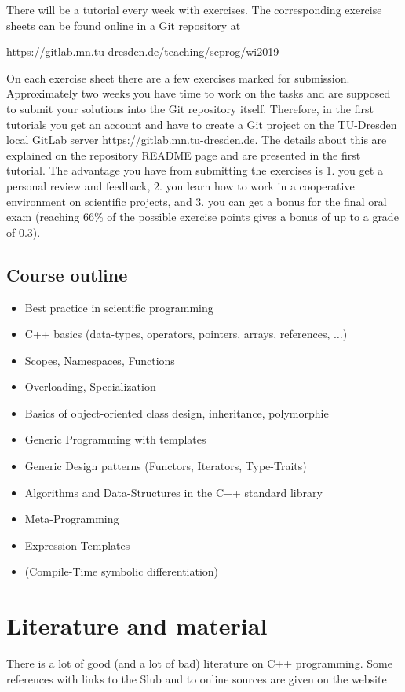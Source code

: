 There will be a tutorial every week with exercises. The corresponding exercise sheets can be found online in a Git repository at

\url{https://gitlab.mn.tu-dresden.de/teaching/scprog/wi2019}

On each exercise sheet there are a few exercises marked for submission. Approximately two weeks you have time to work on the tasks
and are supposed to submit your solutions into the Git repository itself. Therefore, in the first tutorials you get an account and
have to create a Git project on the TU-Dresden local GitLab server \url{https://gitlab.mn.tu-dresden.de}. The details about this are
explained on the repository README page and are presented in the first tutorial. The advantage you have from submitting the exercises
is 1. you get a personal review and feedback, 2. you learn how to work in a cooperative environment on scientific projects, and 3. you
can get a bonus for the final oral exam (reaching 66\% of the possible exercise points gives a bonus of up to a grade of 0.3).

\subsection{Course outline}
\begin{itemize}
  \item Best practice in scientific programming
  \item C++ basics (data-types, operators, pointers, arrays, references, $\ldots$)
  \item Scopes, Namespaces, Functions
  \item Overloading, Specialization
  \item Basics of object-oriented class design, inheritance, polymorphie
  \item Generic Programming with templates
  \item Generic Design patterns (Functors, Iterators, Type-Traits)
  \item Algorithms and Data-Structures in the C++ standard library
  \item Meta-Programming
  \item Expression-Templates
  \item (Compile-Time symbolic differentiation)
\end{itemize}

\section{Literature and material}
There is a lot of good (and a lot of bad) literature on C++ programming. Some references with links to the Slub and to online sources
are given on the website

